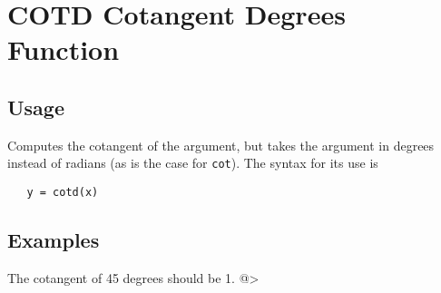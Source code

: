 \section{COTD Cotangent Degrees Function}

\subsection{Usage}

Computes the cotangent of the argument, but takes
the argument in degrees instead of radians (as is the case
for \verb|cot|). The syntax for its use is
\begin{verbatim}
   y = cotd(x)
\end{verbatim}
\subsection{Examples}

The cotangent of 45 degrees should be 1.
@>
